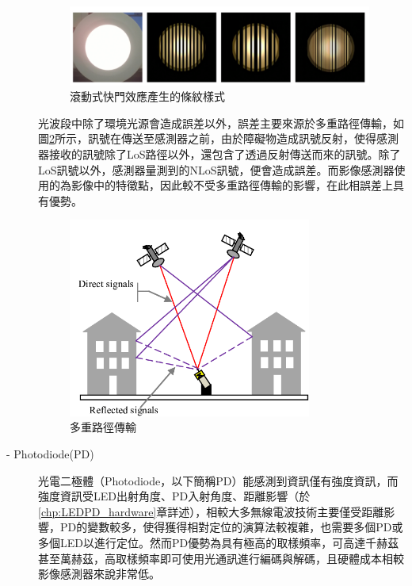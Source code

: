 \begin{description}
                    \begin{figure}[htpb]
                        \centering
                        \includegraphics[width=10cm]{ch2pic/rolling_shutter_case.png}
                        \caption{滾動式快門效應產生的條紋樣式\cite{pic:rolling_shutter_case}}
                        \label{pic:rolling_shutter_case}
                    \end{figure}

                    \qquad
                    光波段中除了環境光源會造成誤差以外，誤差主要來源於多重路徑傳輸，如圖\ref{pic:multipath}所示，訊號在傳送至感測器之前，由於障礙物造成訊號反射，使得感測器接收的訊號除了LoS路徑以外，還包含了透過反射傳送而來的訊號。除了LoS訊號以外，感測器量測到的NLoS訊號，便會造成誤差。而影像感測器使用的為影像中的特徵點，因此較不受多重路徑傳輸的影響，在此相誤差上具有優勢。

                    \begin{figure}[htpb]
                        \centering
                        \includegraphics[width=8cm]{ch2pic/multipath.png}
                        \caption{多重路徑傳輸\cite{pic:multipath}}
                        \label{pic:multipath}
                    \end{figure}

                    \item[- Photodiode(PD)]\hfill
                    
                    \qquad
                    光電二極體（Photodiode，以下簡稱PD）能感測到資訊僅有強度資訊，而強度資訊受LED出射角度、PD入射角度、距離影響（於\ref{chp:LEDPD_hardware}章詳述），相較大多無線電波技術主要僅受距離影響，PD的變數較多，使得獲得相對定位的演算法較複雜，也需要多個PD或多個LED以進行定位。然而PD優勢為具有極高的取樣頻率，可高達千赫茲甚至萬赫茲，高取樣頻率即可使用光通訊進行編碼與解碼，且硬體成本相較影像感測器來說非常低。


\end{description}
